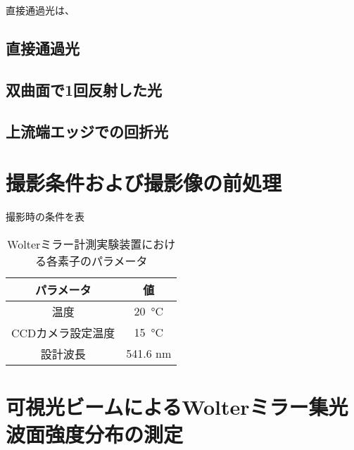 直接通過光は、
\subsection{直接通過光}


\subsection{双曲面で1回反射した光}


\subsection{上流端エッジでの回折光}
\label{chap5_}

\clearpage
\newpage

\section{撮影条件および撮影像の前処理}

撮影時の条件を表

\begin{table}[!ht]
\begin{center}
  \begin{tabular}{|c|c|} \hline
    パラメータ & 値 \\ \hline
    温度 & \SI{20}{\degreeCelsius}  \\
    CCDカメラ設定温度 & \SI{15}{\degreeCelsius} \\
    設計波長 & 541.6 nm \\ \hline
  \end{tabular}
  \caption{Wolterミラー計測実験装置における各素子のパラメータ}
  \label{tb:mirror_experiment_params}
\end{center}
\end{table}


\clearpage
\newpage

\section{可視光ビームによるWolterミラー集光波面強度分布の測定}



\clearpage

\newpage

